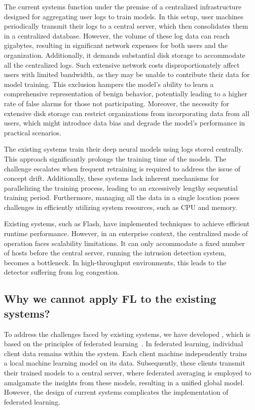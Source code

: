  The current systems function under the premise of a centralized infrastructure designed for aggregating user logs to train models. In this setup, user machines periodically transmit their logs to a central server, which then consolidates them in a centralized database. However, the volume of these log data can reach gigabytes, resulting in significant network expenses for both users and the organization. Additionally, it demands substantial disk storage to accommodate all the centralized logs. Such extensive network costs disproportionately affect users with limited bandwidth, as they may be unable to contribute their data for model training. This exclusion hampers the model's ability to learn a comprehensive representation of benign behavior, potentially leading to a higher rate of false alarms for those not participating. Moreover, the necessity for extensive disk storage can restrict organizations from incorporating data from all users, which might introduce data bias and degrade the model's performance in practical scenarios.

 The existing systems train their deep neural models using logs stored centrally. This approach significantly prolongs the training time of the models. The challenge escalates when frequent retraining is required to address the issue of concept drift. Additionally, these systems lack inherent mechanisms for parallelizing the training process, leading to an excessively lengthy sequential training period. Furthermore, managing all the data in a single location poses challenges in efficiently utilizing system resources, such as CPU and memory.

 Existing systems, such as Flash, have implemented techniques to achieve efficient runtime performance. However, in an enterprise context, the centralized mode of operation faces scalability limitations. It can only accommodate a fixed number of hosts before the central server, running the intrusion detection system, becomes a bottleneck. In high-throughput environments, this leads to the detector suffering from log congestion.

\subsection{Why we cannot apply FL to the existing systems?}

To address the challenges faced by existing systems, we have developed \Sys, which is based on the principles of federated learning~\cite{mcmahan2017communication}. In federated learning, individual client data remains within the system. Each client machine independently trains a local machine learning model on its data. Subsequently, these clients transmit their trained models to a central server, where federated averaging is employed to amalgamate the insights from these models, resulting in a unified global model. However, the design of current systems complicates the implementation of federated learning. 

